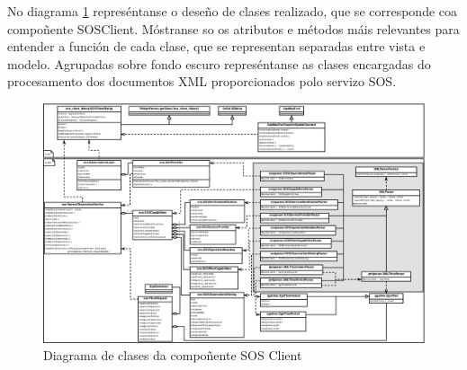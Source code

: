 No diagrama \ref{fig:diaClassSOSClient} represéntanse o deseño de clases realizado, que se corresponde coa compoñente SOSClient. Móstranse so os atributos e métodos máis relevantes para entender a función de cada clase, que se representan separadas entre vista e modelo. Agrupadas sobre fondo escuro represéntanse as clases encargadas do procesamento dos documentos XML proporcionados polo servizo SOS.

\begin{figure}
 \centering
 \includegraphics[width=\textwidth]{images/clases_sos_client.eps}
 \caption{Diagrama de clases da compoñente SOS Client}
 \label{fig:diaClassSOSClient}
\end{figure}

